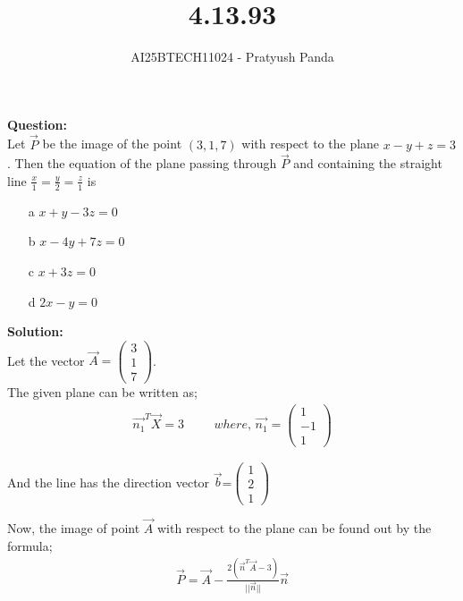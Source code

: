 \documentclass{beamer}
\title{4.13.93}
\author{AI25BTECH11024 - Pratyush Panda}
\providecommand{\brak}[1]{\ensuremath{\left(#1\right)}}
\theoremstyle{remark}
\newcommand{\myvec}[1]{\ensuremath{\begin{pmatrix}#1\end{pmatrix}}}
\numberwithin{equation}{section}
\begin{document}
\maketitle

\begin{frame}
\textbf{Question: } \\
Let $\Vec{P}$ be the image of the point $\brak{3,1,7}$ with respect to the plane $x-y+z=3$. Then the equation of the plane passing through $\Vec{P}$ and containing the straight line $\frac{x}{1}=\frac{y}{2}=\frac{z}{1}$ is
\begin{enumerate}
\item[a] $x+y-3z=0$
\item[b] $x-4y+7z=0$
\item[c] $x+3z=0$
\item[d] $2x-y=0$
\end{enumerate}
\end{frame}

\begin{frame}
\textbf{Solution: } \\
Let the vector $\Vec{A}=\myvec{3 \\ 1 \\ 7}$. \\

The given plane can be written as;
\begin{align}
\Vec{n_1}^T\Vec{X}=3 \hspace{1cm} where, \, \Vec{n_1}=\myvec{1 \\ -1 \\ 1}
\end{align}

And the line has the direction vector $\Vec{b}$=$\myvec{1 \\ 2 \\ 1}$

Now, the image of point $\Vec{A}$ with respect to the plane can be found out by the formula;
\begin{align}
\Vec{P}=\Vec{A}-\frac{2\brak{\Vec{n}^T\Vec{A}-3}}{||\Vec{n}||}\Vec{n}
\end{align}
\end{frame}
\end{document}
